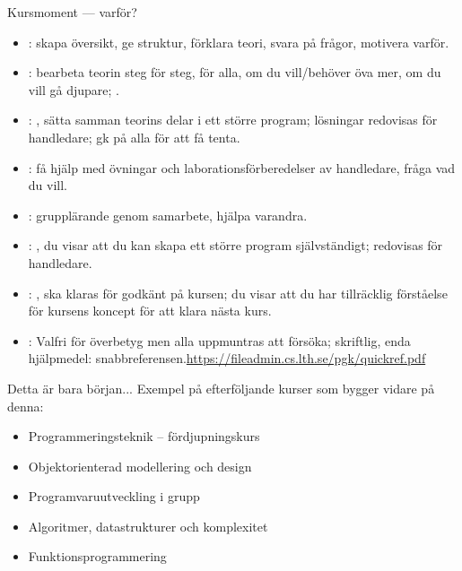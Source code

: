 \begin{Slide}{Kursmoment --- varför?}\SlideFontTiny
\begin{itemize}

\item {}: skapa översikt, ge struktur, förklara teori, svara på frågor, motivera varför.

\item {}: bearbeta teorin steg för steg,  för alla,  om du vill/behöver öva mer,  om du vill gå djupare; .

\item {}: , sätta samman teorins delar i ett större program; lösningar redovisas för handledare; gk på alla för att få tenta.

\item {}: få hjälp med övningar och laborationsförberedelser av handledare, fråga vad du vill.

\item {}: grupplärande genom samarbete, hjälpa varandra.

\item {}: , du visar att du kan skapa ett större program självständigt; redovisas för handledare.
\item {}: , ska klaras för godkänt på kursen; du visar att du har tillräcklig förståelse för kursens koncept för att klara nästa kurs. 

\item {}: Valfri för överbetyg men alla uppmuntras att försöka; skriftlig, enda hjälpmedel: snabbreferensen.\url{https://fileadmin.cs.lth.se/pgk/quickref.pdf}
\end{itemize}
\end{Slide}

\ifkompendium\else
\begin{SlideExtra}{Detta är bara början... }
Exempel på efterföljande kurser som bygger vidare på denna:
\begin{itemize}
\item Programmeringsteknik -- fördjupningskurs
\item Objektorienterad modellering och design
\item Programvaruutveckling i grupp
\item Algoritmer, datastrukturer och komplexitet
\item Funktionsprogrammering
\end{itemize}
\end{SlideExtra}


